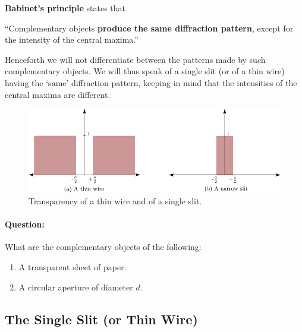 \begin{refsection}
\begin{imp}
\textbf{Babinet's principle} states that

\begin{center}
``Complementary objects \textbf{produce the same diffraction pattern}, except for the intensity of the central maxima.''
\end{center}


Henceforth we will not differentiate between the patterns made by such complementary objects. We will thus speak of a single slit (or of a thin wire) having the `same' diffraction pattern, keeping in mind that the intensities of the central maxima are different.
\end{imp}

\begin{figure}[!htb]
    \centering
    \includegraphics[scale=0.6]{figs/complementary.png}
    \caption{Transparency of a thin wire and of a single slit.}
    \label{fig:complementary}
\end{figure}

\begin{question}
\paragraph{Question:} What are the complementary objects of the following:

\begin{enumerate}
\item A transparent sheet of paper.
\item A circular aperture of diameter $d$.
\end{enumerate}
\end{question}



\subsection*{The Single Slit (or Thin Wire)}


\end{refsection}
